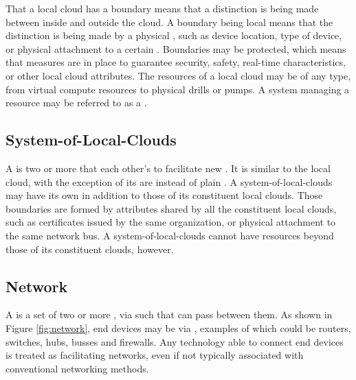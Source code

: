 That a local cloud has a boundary means that a distinction is being made between  inside and outside the cloud.
A boundary being local means that the distinction is being made by a physical , such as device location, type of device, or physical attachment to a certain .
Boundaries may be protected, which means that measures are in place to guarantee security, safety, real-time characteristics, or other local cloud attributes.
The resources of a local cloud may be of any type, from virtual compute resources to physical drills or pumps.
A system managing a resource may be referred to as a .

\subsection{System-of-Local-Clouds}
\label{sec:concepts:solc}

A  is two or more  that  each other's  to facilitate new .
It is similar to the local cloud, with the exception of its  are  instead of plain .
A system-of-local-clouds may have its own  in addition to those of its constituent local clouds.
Those boundaries are formed by attributes shared by all the constituent local clouds, such as certificates issued by the same organization, or physical attachment to the same network bus.
A system-of-local-clouds cannot have resources beyond those of its constituent clouds, however.

\subsection{Network}
\label{sec:concepts:network}

A  is a set of two or more ,  via  such that  can pass between them.
As shown in Figure \ref{fig:network}, end devices may be  via , examples of which could be routers, switches, hubs, busses and firewalls.
Any technology able to connect end devices is treated as facilitating networks, even if not typically associated with conventional networking methods.

